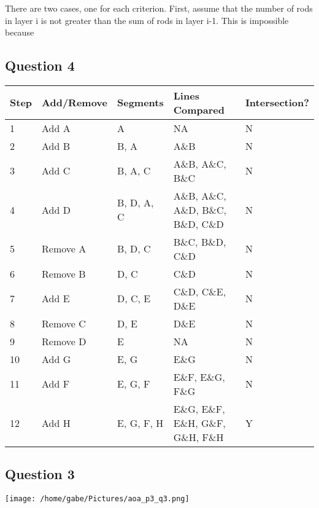 \documentclass[12pt]{article}
\begin{document}
There are two cases, one for each criterion.
First, assume that the number of rods in layer i is not greater than 
the sum of rods in layer i-1. This is impossible because 

\subsection*{Question 4}
\begin{center}
  \begin{tabular}{ | l | l | l | l | l | }
    \hline
    Step & Add/Remove & Segments   & Lines Compared & Intersection? \\ \hline
    1    & Add A       & A          & NA    & N \\ \hline
		2    & Add B       & B, A       & A\&B    & N \\ \hline
		3    & Add C       & B, A, C    & A\&B, A\&C, B\&C & N \\ \hline
		4    & Add D       & B, D, A, C & A\&B, A\&C, A\&D, B\&C, B\&D, C\&D & N \\ \hline
		5    & Remove A    & B, D, C    & B\&C, B\&D, C\&D & N \\ \hline
		6    & Remove B    & D, C       & C\&D     & N \\ \hline
		7    & Add E       & D, C, E    & C\&D, C\&E, D\&E     & N \\ \hline
		8    & Remove C    & D, E       & D\&E     & N \\ \hline
    9    & Remove D    & E          & NA     & N \\ \hline
		10   & Add G			 & E, G       & E\&G     & N \\ \hline
		11   & Add F			 & E, G, F    & E\&F, E\&G, F\&G     & N \\ \hline
		12   & Add H	  	 & E, G, F, H & E\&G, E\&F, E\&H, G\&F, G\&H, F\&H & Y \\ \hline
  \end{tabular}
\end{center}


\subsection*{Question 3}

\texttt{[image: /home/gabe/Pictures/aoa\_p3\_q3.png]}
\end{document}
